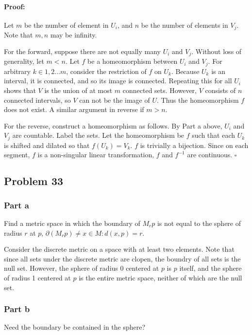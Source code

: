 \documentclass{article}
\newenvironment{proof}{\paragraph{Proof:}}{\hfill$\square$}
\begin{document}
\begin{proof}

Let $m$ be the number of element in $U_i$, and $n$ be the number of elements in $V_j$. Note that $m, n$ may be infinity.

For the forward, suppose there are not equally many $U_i$ and $V_j$. Without loss of generality, let $m < n$. Let $f$ be a homeomorphism between $U_i$ and $V_j$. For arbitrary $k \in 1, 2 \dots m$, consider the restriction of $f$ on $U_k$. Because $U_k$ is an interval, it is connected, and so its image is connected. Repeating this for all $U_i$ shows that $V$ is the union of at most $m$ connected sets. However, $V$ consists of $n$ connected intervals, so $V$ can not be the image of $U$. Thus the homeomorphism $f$ does not exist. A similar argument in reverse if $m > n$.

For the reverse, construct a homeomorphism as follows. By Part a above, $U_i$ and $V_j$ are countable. Label the sets. Let the homeomorphism be $f$ such that each $U_k$ is shifted and dilated so that $f(U_k) = V_k$. $f$ is trivially a bijection. Since on each segment, $f$ is a non-singular linear transformation, $f$ and $f^{-1}$ are continuous.
\end{proof}

\subsection*{Problem 33}

\subsubsection*{Part a}
Find a metric space in which the boundary of $M_r p$ is not equal to the sphere of radius $r$ at $p$, $\partial(M_r p) \neq {x \in M: d(x, p) = r}$.

Consider the discrete metric on a space with at least two elements. Note that since all sets under the discrete metric are clopen, the boundry of all sets is the null set. However, the sphere of radius 0 centered at $p$ is $p$ itself, and the sphere of radius 1 centered at $p$ is the entire metric space, neither of which are the null set.

\subsubsection*{Part b}

Need the boundary be contained in the sphere?
\end{document}
